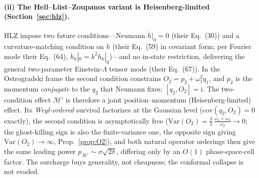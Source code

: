 \documentclass[11pt]{article}
\theoremstyle{definition}
\theoremstyle{remark}
\newcommand{\ii}{\mathrm{i}}
\begin{document}
\paragraph{(ii) The Hell--L\"ust--Zoupanos variant is
Heisenberg-limited (Section~\ref{sec:hlz}).}
HLZ impose two future conditions---Neumann $\dot h|_{0}=0$
(their Eq.~(30)) and a curvature-matching condition on $\ddot h$
(their Eq.~(59) in covariant form; per Fourier mode their Eq.~(64),
$\ddot h_{k}|_{0}=k^{2}h_{k}|_{0}$)---and no in-state restriction,
delivering the general two-parameter Einstein-$\Lambda$ tensor mode
(their Eq.~(67)). In the Ostrogradski frame the second condition
constrains $O_{2}=p_{2}+\omega_{1}^{2}q_{1}$, and $p_{2}$ is the
momentum \emph{conjugate} to the $q_{2}$ that Neumann fixes:
$[q_{2},O_{2}]=\ii$. The two-condition effect $\mathcal{M}'$ is therefore a
joint position--momentum (Heisenberg-limited) effect. Its
\emph{Weyl-ordered} survival factorizes at the Gaussian level
($\mathrm{cov}(q_{2},O_{2})=0$ exactly), the second condition is
asymptotically free
($\mathrm{Var}(O_{2})=\tfrac{\delta}{2}\,
\tfrac{\omega_{1}+\omega_{2}}{\omega_{2}}\to0$; the ghost-killing sign
is also the finite-variance one, the opposite sign giving
$\mathrm{Var}(O_{2})\to\infty$, Prop.~\ref{prop:O2}), and both natural
operator orderings then give the same leading power
$p_{\mathcal{M}'}\sim\sigma\sqrt{2\delta}$, differing only by an $O(1)$
phase-space-cell factor. The surcharge buys generality, not
cheapness; the conformal collapse is not evaded.
\end{document}
